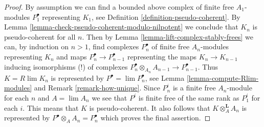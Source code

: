 \documentclass[10pt,a4paper]{amsart}
\theoremstyle{plain}
\theoremstyle{definition}
\theoremstyle{remark}
\numberwithin{equation}{subsection}
\def\lim{\mathop{\mathrm{lim}}\nolimits}
\begin{document}
\begin{proof}
By assumption we can find a bounded above complex of
finite free $A_1$-modules $P_1^\bullet$ representing $K_1$, see
Definition \ref{definition-pseudo-coherent}. By
Lemma \ref{lemma-check-pseudo-coherent-modulo-nilpotent}
we conclude that $K_n$ is pseudo-coherent for all $n$.
Then by Lemma \ref{lemma-lift-complex-stably-frees}
we can, by induction on $n > 1$, find
complexes $P_n^\bullet$ of finite free $A_n$-modules representing $K_n$
and maps $P_n^\bullet \to P_{n - 1}^\bullet$ representing the maps
$K_n \to K_{n - 1}$ inducing isomorphisms (!)
of complexes $P_n^\bullet \otimes_{A_n} A_{n - 1} \to P_{n - 1}^\bullet$.
Thus $K = R\lim K_n$ is represented by $P^\bullet = \lim P_n^\bullet$, see
Lemma \ref{lemma-compute-Rlim-modules} and
Remark \ref{remark-how-unique}.
Since $P_n^i$ is a finite free $A_n$-module for each $n$ and
$A = \lim A_n$ we see that $P^i$ is finite free of the same rank
as $P_1^i$ for each $i$.
This means that $K$ is pseudo-coherent.
It also follows that $K \otimes_A^\mathbf{L} A_n$ is represented by
$P^\bullet \otimes_A A_n = P_n^\bullet$ which proves the final
assertion.
\end{proof}
\end{document}
